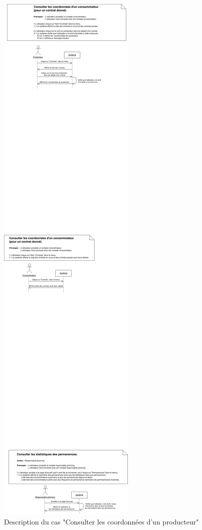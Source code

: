\documentclass[12pt]{report}
\begin{document}
\begin{figure}[!h]
\centering
\includegraphics[width=1.\textwidth]{./ressources/desc_UC_coo_prod_contrats.png}
\caption{Description du cas "Consulter les coordonnées d'un producteur"}
\end{figure}
\clearpage
\end{document}
